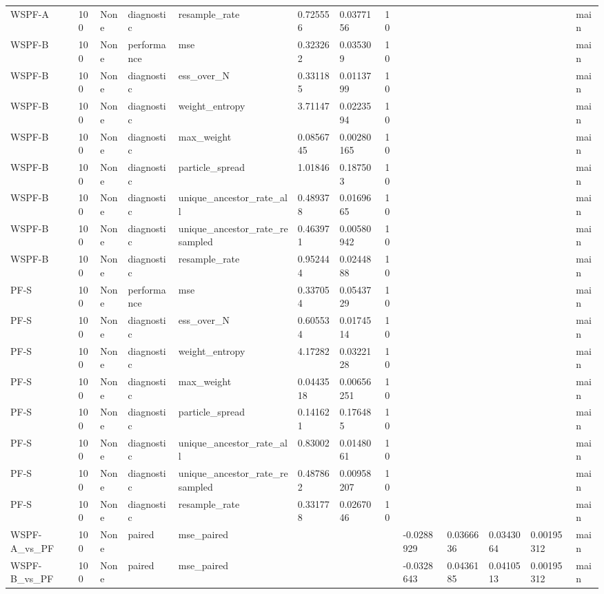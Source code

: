 \begin{tabular}{lllllllllllll}
WSPF-A & 100 & None & diagnostic & resample\_rate & 0.725556 & 0.0377156 & 10 &  &  &  &  & main \\
WSPF-B & 100 & None & performance & mse & 0.323262 & 0.035309 & 10 &  &  &  &  & main \\
WSPF-B & 100 & None & diagnostic & ess\_over\_N & 0.331185 & 0.0113799 & 10 &  &  &  &  & main \\
WSPF-B & 100 & None & diagnostic & weight\_entropy & 3.71147 & 0.0223594 & 10 &  &  &  &  & main \\
WSPF-B & 100 & None & diagnostic & max\_weight & 0.0856745 & 0.00280165 & 10 &  &  &  &  & main \\
WSPF-B & 100 & None & diagnostic & particle\_spread & 1.01846 & 0.187503 & 10 &  &  &  &  & main \\
WSPF-B & 100 & None & diagnostic & unique\_ancestor\_rate\_all & 0.489378 & 0.0169665 & 10 &  &  &  &  & main \\
WSPF-B & 100 & None & diagnostic & unique\_ancestor\_rate\_resampled & 0.463971 & 0.00580942 & 10 &  &  &  &  & main \\
WSPF-B & 100 & None & diagnostic & resample\_rate & 0.952444 & 0.0244888 & 10 &  &  &  &  & main \\
PF-S & 100 & None & performance & mse & 0.337054 & 0.0543729 & 10 &  &  &  &  & main \\
PF-S & 100 & None & diagnostic & ess\_over\_N & 0.605534 & 0.0174514 & 10 &  &  &  &  & main \\
PF-S & 100 & None & diagnostic & weight\_entropy & 4.17282 & 0.0322128 & 10 &  &  &  &  & main \\
PF-S & 100 & None & diagnostic & max\_weight & 0.0443518 & 0.00656251 & 10 &  &  &  &  & main \\
PF-S & 100 & None & diagnostic & particle\_spread & 0.141621 & 0.176485 & 10 &  &  &  &  & main \\
PF-S & 100 & None & diagnostic & unique\_ancestor\_rate\_all & 0.83002 & 0.0148061 & 10 &  &  &  &  & main \\
PF-S & 100 & None & diagnostic & unique\_ancestor\_rate\_resampled & 0.487862 & 0.00958207 & 10 &  &  &  &  & main \\
PF-S & 100 & None & diagnostic & resample\_rate & 0.331778 & 0.0267046 & 10 &  &  &  &  & main \\
WSPF-A\_vs\_PF & 100 & None & paired & mse\_paired &  &  &  & -0.0288929 & 0.0366636 & 0.0343064 & 0.00195312 & main \\
WSPF-B\_vs\_PF & 100 & None & paired & mse\_paired &  &  &  & -0.0328643 & 0.0436185 & 0.0410513 & 0.00195312 & main \\
\hline
\end{tabular}
